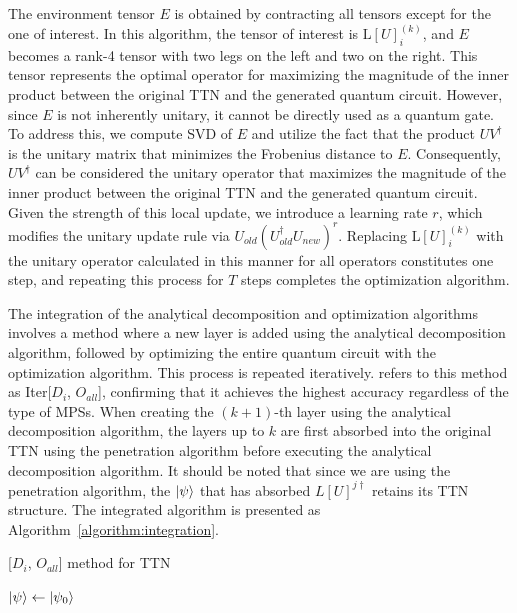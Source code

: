 \documentclass[12pt,dvipdfmx,twoside,openright]{report}
\begin{document}
The environment tensor $E$ is obtained by contracting all tensors except for the one of interest.
In this algorithm, the tensor of interest is $\mathrm{L}[U]^{(k)}_i$, and $E$ becomes a rank-4 tensor with two legs on the left and two on the right.
This tensor represents the optimal operator for maximizing the magnitude of the inner product between the original TTN and the generated quantum circuit.
However, since $E$ is not inherently unitary, it cannot be directly used as a quantum gate.
To address this, we compute SVD of $E$ and utilize the fact that the product $UV^\dagger$ is the unitary matrix that minimizes the Frobenius distance to $E$.
Consequently, $UV^\dagger$ can be considered the unitary operator that maximizes the magnitude of the inner product between the original TTN and the generated quantum circuit.
Given the strength of this local update, we introduce a learning rate $r$, which modifies the unitary update rule via $U_{old}(U_{old}^\dagger U_{new})^r$. 
Replacing $\mathrm{L}[U]^{(k)}_i$ with the unitary operator calculated in this manner for all operators constitutes one step, and repeating this process for $T$ steps completes the optimization algorithm.

The integration of the analytical decomposition and optimization algorithms involves a method where a new layer is added using the analytical decomposition algorithm, followed by optimizing the entire quantum circuit with the optimization algorithm.
This process is repeated iteratively.
\cite{mpsdecomp} refers to this method as Iter[$D_i$, $O_{all}$], confirming that it achieves the highest accuracy regardless of the type of MPSs.
When creating the $(k+1)$-th layer using the analytical decomposition algorithm, the layers up to $k$ are first absorbed into the original TTN using the penetration algorithm before executing the analytical decomposition algorithm.
It should be noted that since we are using the penetration algorithm, the $\ket{\psi}$ that has absorbed $L[U]^{j\dagger}$ retains its TTN structure.
The integrated algorithm is presented as Algorithm~\ref{algorithm:integration}.
\begin{algorithm}[tbp]
 \caption{[$D_i$, $O_{all}$] method for TTN}
 \label{algorithm:integration}
 $\ket{\psi} \leftarrow{\ket{\psi_0}}$\;
\end{algorithm}
\end{document}
